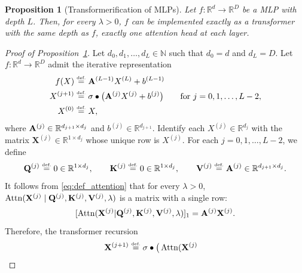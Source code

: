 \documentclass{article}
\newtheorem{proposition}{Proposition}[section]
\newcommand{\eqdef }{\ensuremath{\stackrel{\mbox{\upshape\tiny def.}}{=}}}
\begin{document}
\begin{proposition}[Transformerification of MLPs]
\label{prop:transformerification__SparseVersion}
Let $f:\mathbb{R}^d\to \mathbb{R}^D$ be a MLP with depth $L$. %
Then, for every $\lambda>0$, $f$ can be implemented exactly as a %
transformer with the same depth %
as $f$, exactly one attention head at each layer. %
\end{proposition}

\begin{proof}[{Proof of Proposition~\ref{prop:transformerification__SparseVersion}}]
Let $d_0,d_1,\dots,d_L\in\mathbb{N}$ such that $d_0=d$ and $d_L=D$.
Let $f:\mathbb{R}^d\to\mathbb{R}^D$ admit the iterative representation
\begin{equation}
\label{eq:representation_MLP_}
    \begin{aligned}
    f(X)
    & \eqdef  
    {\bf A}^{(L-1)} X^{(L)}+b^{(L-1)}
    \\
    X^{(j+1)} 
    &
    \eqdef  
    \sigma\bullet\big(
        {\bf A}^{(j)}X^{(j)}
            +
        b^{(j)}
    \big)
    \qquad 
            \mbox{for }  
        j=0,1,\dots,L-2,    
    \\
    X^{(0)} &\eqdef X,
    \end{aligned}
\end{equation}
where ${\bf A}^{(j)}\in\mathbb{R}^{d_{j+1}\times d_j}$ and $b^{(j)}\in\mathbb{R}^{d_{j+1}}$.
Identify each $X^{(j)}\in\mathbb{R}^{d_j}$ with the matrix
$\mathbf{X}^{(j)}\in\mathbb{R}^{1\times d_j}$ whose unique row is $X^{(j)}$.
For each $j=0,1,\dots,L-2$, we define
\[
    {\bf Q}^{(j)}\eqdef  0\in\mathbb{R}^{1\times d_j},
    \qquad
    {\bf K}^{(j)}\eqdef  0\in\mathbb{R}^{1\times d_j},
    \qquad
    {\bf V}^{(j)}\eqdef  {\bf A}^{(j)}\in\mathbb{R}^{d_{j+1}\times d_j}.
\]
It follows from \eqref{eq:def_attention} that for every $\lambda>0$,
$\operatorname{Attn}(\mathbf{X}^{(j)} \mid {\bf Q}^{(j)},{\bf K}^{(j)},{\bf V}^{(j)},\lambda)$ is a matrix with a single row:
\[
    [\operatorname{Attn}(
        \mathbf{X}^{(j)}
        |{\bf Q}^{(j)},{\bf K}^{(j)},{\bf V}^{(j)},\lambda
    )]_1
    =
    {\bf A}^{(j)} {\bf X}^{(j)}.
\]
Therefore, the transformer recursion
\begin{align*} 
    \mathbf{X}^{(j+1)}
    &\eqdef 
    \sigma\bullet \big(
        \operatorname{Attn}(
            \mathbf{X}^{(j)}

\end{align*}
\end{proof}
\end{document}
